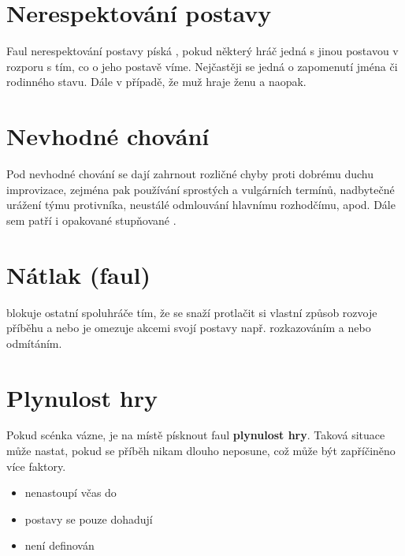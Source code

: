 \documentclass[main.tex]{subfiles}
\begin{document}
 
\needspace{5cm} \section{Nerespektování postavy} \label{nerespektování postavy}  
 
Faul nerespektování postavy píská , pokud některý hráč  
jedná s jinou postavou v rozporu s tím, co o jeho postavě víme. 
Nejčastěji se jedná o zapomenutí jména či rodinného stavu. 
Dále v případě, že muž hraje ženu a naopak. 
\needspace{5cm} \section{Nevhodné chování} \label{nevhodné chování}  
 
 
Pod nevhodné chování se dají zahrnout rozličné chyby proti dobrému duchu 
improvizace, zejména pak používání sprostých a vulgárních termínů, 
nadbytečné urážení týmu protivníka, neustálé odmlouvání hlavnímu rozhodčímu,  
apod. Dále sem patří i opakované stupňované . 
\needspace{5cm} \section{Nátlak (faul)} \label{nátlak (faul)}  
 blokuje ostatní spoluhráče tím, že se snaží protlačit si vlastní způsob rozvoje příběhu a nebo je omezuje akcemi svojí postavy např. rozkazováním a nebo odmítáním. 
 
 
\needspace{5cm} \section{Plynulost hry} \label{plynulost hry}  
 
Pokud scénka vázne, je na místě písknout faul \textbf{plynulost hry}{}. Taková situace může nastat, pokud se příběh nikam dlouho neposune, což může být zapříčiněno více faktory. 
 
\begin{itemize}
\item  {} nenastoupí včas do 
\item  postavy se pouze dohadují
\item  není definován 
\end{itemize}
 
\end{document}
